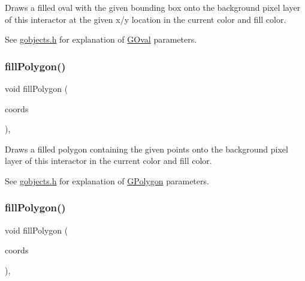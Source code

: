 Draws a filled oval with the given bounding box onto the background pixel layer of this interactor at the given x/y location in the current color and fill color. 

See \mbox{\hyperlink{gobjects_8h_source}{gobjects.\+h}} for explanation of \mbox{\hyperlink{classsgl_1_1GOval}{G\+Oval}} parameters. \mbox{\label{classsgl_1_1GDrawingSurface_a15f8c1c4409ef51c1a30a92a195b8f66}} 
\subsubsection{\texorpdfstring{fill\+Polygon()}{fillPolygon()}\hspace{0.1cm}{\footnotesize\ttfamily [1/2]}}
{\footnotesize\ttfamily void fill\+Polygon (\begin{DoxyParamCaption}\item[{std\+::initializer\+\_\+list$<$ double $>$}]{coords }\end{DoxyParamCaption})\hspace{0.3cm}{\ttfamily [virtual]}, {\ttfamily [inherited]}}



Draws a filled polygon containing the given points onto the background pixel layer of this interactor in the current color and fill color. 

See \mbox{\hyperlink{gobjects_8h_source}{gobjects.\+h}} for explanation of \mbox{\hyperlink{classsgl_1_1GPolygon}{G\+Polygon}} parameters. \mbox{\label{classsgl_1_1GDrawingSurface_a31822d59786156ebf1cc3b2f7fb70330}} 
\subsubsection{\texorpdfstring{fill\+Polygon()}{fillPolygon()}\hspace{0.1cm}{\footnotesize\ttfamily [2/2]}}
{\footnotesize\ttfamily void fill\+Polygon (\begin{DoxyParamCaption}\item[{std\+::initializer\+\_\+list$<$ \mbox{\hyperlink{structsgl_1_1GPoint}{G\+Point}} $>$}]{coords }\end{DoxyParamCaption})\hspace{0.3cm}{\ttfamily [virtual]}, {\ttfamily [inherited]}}



